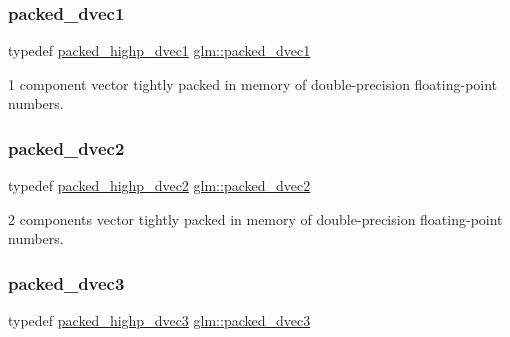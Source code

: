 \subsubsection{\texorpdfstring{packed\+\_\+dvec1}{packed\_dvec1}}
{\footnotesize\ttfamily typedef \hyperlink{group__gtc__type__aligned_ga28333ae58dc1ce6fdf75a8dba0065603}{packed\+\_\+highp\+\_\+dvec1} \hyperlink{group__gtc__type__aligned_ga1b85bcaa9f7caaec77f3a31d35669a98}{glm\+::packed\+\_\+dvec1}}



1 component vector tightly packed in memory of double-\/precision floating-\/point numbers. 

\mbox{\label{group__gtc__type__aligned_ga88996e3df7350600759c8006ffcb7782}} 
\subsubsection{\texorpdfstring{packed\+\_\+dvec2}{packed\_dvec2}}
{\footnotesize\ttfamily typedef \hyperlink{group__gtc__type__aligned_ga8c26414d99b8996aa7dc73e1dc8a06bd}{packed\+\_\+highp\+\_\+dvec2} \hyperlink{group__gtc__type__aligned_ga88996e3df7350600759c8006ffcb7782}{glm\+::packed\+\_\+dvec2}}



2 components vector tightly packed in memory of double-\/precision floating-\/point numbers. 

\mbox{\label{group__gtc__type__aligned_ga57dabe800889e40fa81a5a7a81cc25f0}} 
\subsubsection{\texorpdfstring{packed\+\_\+dvec3}{packed\_dvec3}}
{\footnotesize\ttfamily typedef \hyperlink{group__gtc__type__aligned_ga46950596525c0d1983113ead5f676651}{packed\+\_\+highp\+\_\+dvec3} \hyperlink{group__gtc__type__aligned_ga57dabe800889e40fa81a5a7a81cc25f0}{glm\+::packed\+\_\+dvec3}}



